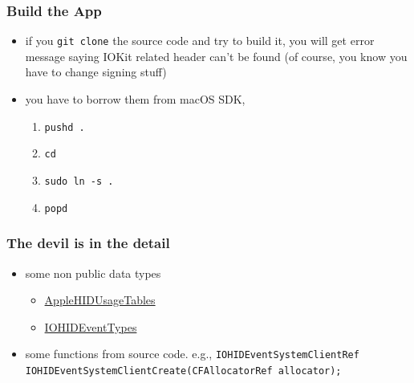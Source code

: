 \documentclass{beamer}
\begin{document}
\begin{frame}
  \frametitle{Build the App}
  \begin{itemize}
  \item if you \texttt{git clone} the source code and try to build it, you will get error message saying IOKit related header can't be found (of course, you know you have to change signing stuff)
  \item you have to borrow them from macOS SDK,
    \begin{enumerate}
    \item \texttt{pushd .}
    \item \texttt{cd }
    \item \texttt{sudo ln -s  .}
    \item \texttt{popd}
    \end{enumerate}
  \end{itemize}
\end{frame}

\begin{frame}
  \frametitle{The devil is in the detail}
  \begin{itemize}
  \item some non public data types
    \begin{itemize}
    \item \href{https://opensource.apple.com/source/IOHIDFamily/IOHIDFamily-701.60.2/IOHIDFamily/AppleHIDUsageTables.h.auto.html}{AppleHIDUsageTables}
    \item \href{https://opensource.apple.com/source/IOHIDFamily/IOHIDFamily-701.60.2/IOHIDFamily/IOHIDEventTypes.h.auto.html}{IOHIDEventTypes}
    \end{itemize}
    \item some functions from source code. e.g., \texttt{IOHIDEventSystemClientRef IOHIDEventSystemClientCreate(CFAllocatorRef allocator);}
  \end{itemize}
\end{frame}
\end{document}
